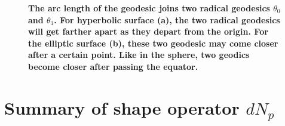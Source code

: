\documentclass[11pt]{article}
\begin{document}
\begin{itemize}
\begin{figure}[tbh]
\begin{minipage}{0.6\linewidth}
\end{minipage}
\caption{\scriptsize
\textbf{The arc length of the geodesic joins two radical geodesics $\theta_{0}$ and $\theta_{1}$. For hyperbolic surface (a), the two radical geodesics will get farther apart as they depart from the origin. For the elliptic surface (b), these two geodesic may come closer after a certain point. Like in the sphere, two geodics become closer after passing the equator. }}\label{fig: arc_length_geo}\vspace{-10pt}
\end{figure}
\end{itemize}


\newpage
\section{Summary of shape operator $dN_{p}$}
\end{document}
